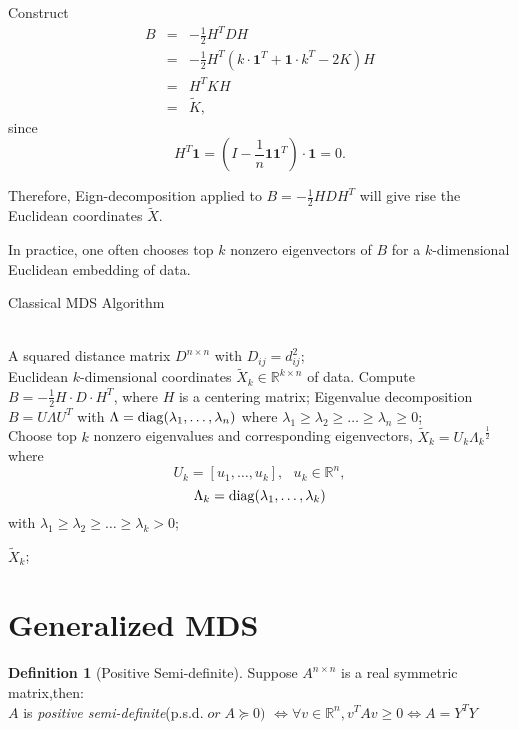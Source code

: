 \documentclass[twoside]{article}
\theoremstyle{definition}
\theoremstyle{definition}
\newtheorem*{defn}{Definition}
\theoremstyle{remark}
\def\R{{\mathbb R}}
\def\diag{{\rm diag}}
\begin{document}
Construct 
\begin{eqnarray*}
B &=& -\frac{1}{2} H^T D H \\
&=& -\frac{1}{2} H^T (k\cdot {\mathbf{1}}^T + \mathbf{1} \cdot k^T -2K)H \\
&=& H^T K H \\
&=& \tilde{K},
\end{eqnarray*}
since 
$$ H^T \mathbf{1} = (I - \frac{1}{n}\mathbf{1}\mathbf{1}^T)\cdot \mathbf{1} = 0.$$

Therefore, Eign-decomposition applied to $B = -\frac{1}{2}HDH^T$ will give rise the Euclidean coordinates $\tilde{X}$. 

In practice, one often chooses top $k$ nonzero eigenvectors of $B$ for a $k$-dimensional Euclidean embedding of data.


\begin{algorithm}[htb]   
\caption{Classical MDS Algorithm}   
\label{alg:cmds}   
\begin{algorithmic}[1] %
\REQUIRE ~~\\ %
A squared distance matrix $ D^{n\times n} $ with $D_{ij} = d_{ij}^2$;
\ENSURE ~~\\ %
Euclidean $k$-dimensional coordinates $\widetilde{X}_k\in \R^{k\times n}$ of data.
\STATE Compute $\displaystyle B = - \frac{1}{2} H \cdot D \cdot H^T $, where $H$ is a centering matrix;   
\STATE 
Eigenvalue decomposition\ $ B = U \Lambda U^T $ with $\Lambda=\diag(\lambda_1,\ldots,\lambda_n)$ where
$\lambda_1\geq \lambda_2\geq \ldots \geq\lambda_n\geq 0 $;\\ 
\STATE Choose top $k$ nonzero eigenvalues and corresponding eigenvectors, $ \widetilde{X}_k = U_k{\Lambda_k}^\frac{1}{2} $ where 
$$U_k=[u_1,\ldots,u_k], \ \ \ u_k\in \R^n,$$
$$\Lambda_k=\diag(\lambda_1,\ldots,\lambda_k)$$
with $\lambda_1\geq \lambda_2\geq \ldots \geq\lambda_k> 0 $;   

\RETURN $\widetilde{X}_k$; %
\end{algorithmic}
\end{algorithm}

\section{Generalized MDS}

\begin{defn}[Positive Semi-definite]
Suppose $A^{n\times n}$ is a real symmetric matrix,then:\\
$A$ is \emph{positive semi-definite}(p.s.d.$\; or\; A\succeq 0)$ $\iff \forall v \in \R^n,v^TAv \geq 0 \iff A=Y^TY$
\end{defn}
\end{document}
